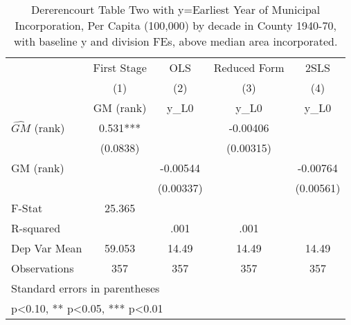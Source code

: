 \begin{table}[htbp]\centering
\def\sym#1{\ifmmode^{#1}\else\(^{#1}\)\fi}
\caption{Dererencourt Table Two with y=Earliest Year of Municipal Incorporation, Per Capita (100,000) by decade in County 1940-70, with baseline y and division FEs, above median area incorporated.}
\begin{tabular}{l*{4}{c}}
\toprule
                    & First Stage   &         OLS   &Reduced Form   &        2SLS   \\
                    &\multicolumn{1}{c}{(1)}&\multicolumn{1}{c}{(2)}&\multicolumn{1}{c}{(3)}&\multicolumn{1}{c}{(4)}\\
                    &\multicolumn{1}{c}{GM  (rank)}&\multicolumn{1}{c}{y\_L0}&\multicolumn{1}{c}{y\_L0}&\multicolumn{1}{c}{y\_L0}\\
\midrule
$\hat{GM}$ (rank)   &       0.531***&               &    -0.00406   &               \\
                    &    (0.0838)   &               &   (0.00315)   &               \\
\addlinespace
GM  (rank)          &               &    -0.00544   &               &    -0.00764   \\
                    &               &   (0.00337)   &               &   (0.00561)   \\
\midrule
F-Stat              &      25.365   &               &               &               \\
R-squared           &               &        .001   &        .001   &               \\
Dep Var Mean        &      59.053   &       14.49   &       14.49   &       14.49   \\
Observations        &         357   &         357   &         357   &         357   \\
\bottomrule
\multicolumn{5}{l}{\footnotesize Standard errors in parentheses}\\
\multicolumn{5}{l}{\footnotesize * p<0.10, ** p<0.05, *** p<0.01}\\
\end{tabular}
\end{table}
